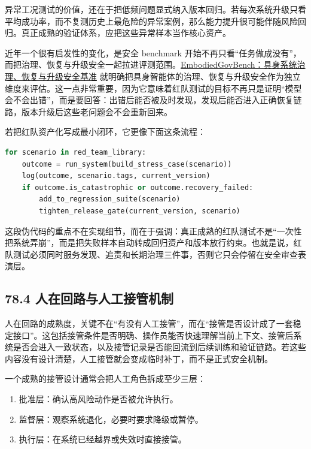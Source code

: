 异常工况测试的价值，还在于把低频问题显式纳入版本回归。若每次系统升级只看平均成功率，而不复测历史上最危险的异常案例，那么能力提升很可能伴随风险回归。真正成熟的验证体系，应把这些异常样本当作核心资产。

近年一个很有启发性的变化，是安全 benchmark 开始不再只看“任务做成没有”，而把治理、恢复与升级安全一起拉进评测范围。\href{https://arxiv.org/abs/2604.11174}{EmbodiedGovBench：具身系统治理、恢复与升级安全基准} 就明确把具身智能体的治理、恢复与升级安全作为独立维度来评估。这一点非常重要，因为它意味着红队测试的目标不再只是证明“模型会不会出错”，而是要回答：出错后能否被及时发现，发现后能否进入正确恢复链路，版本升级后这些老问题会不会重新回来。

若把红队资产化写成最小闭环，它更像下面这条流程：

\begin{lstlisting}[language=python]
for scenario in red_team_library:
    outcome = run_system(build_stress_case(scenario))
    log(outcome, scenario.tags, current_version)
    if outcome.is_catastrophic or outcome.recovery_failed:
        add_to_regression_suite(scenario)
        tighten_release_gate(current_version, scenario)
\end{lstlisting}

这段伪代码的重点不在实现细节，而在于强调：真正成熟的红队测试不是“一次性把系统弄崩”，而是把失败样本自动转成回归资产和版本放行约束。也就是说，红队测试必须同时服务发现、追责和长期治理三件事，否则它只会停留在安全审查表演层。

\subsection*{78.4 人在回路与人工接管机制}


人在回路的成熟度，关键不在“有没有人工接管”，而在“接管是否设计成了一套稳定接口”。这包括接管条件是否明确、操作员能否快速理解当前上下文、接管后系统是否会进入一致状态，以及接管记录是否能回流到后续训练和验证链路。若这些内容没有设计清楚，人工接管就会变成临时补丁，而不是正式安全机制。

一个成熟的接管设计通常会把人工角色拆成至少三层：

\begin{enumerate}
\item 批准层：确认高风险动作是否被允许执行。
\item 监督层：观察系统退化，必要时要求降级或暂停。
\item 执行层：在系统已经越界或失效时直接接管。
\end{enumerate}

